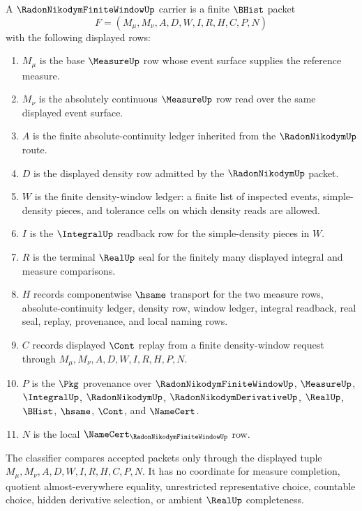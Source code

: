 \begin{definition}
\label{def:radon-nikodym-finite-window-carrier}
A $\RadonNikodymFiniteWindowUp$ carrier is a finite $\BHist$ packet
$$
F=(M_\mu,M_\nu,A,D,W,I,R,H,C,P,N)
$$
with the following displayed rows:
\begin{enumerate}
\item $M_\mu$ is the base $\MeasureUp$ row whose event surface supplies the reference measure.
\item $M_\nu$ is the absolutely continuous $\MeasureUp$ row read over the same displayed event surface.
\item $A$ is the finite absolute-continuity ledger inherited from the $\RadonNikodymUp$ route.
\item $D$ is the displayed density row admitted by the $\RadonNikodymUp$ packet.
\item $W$ is the finite density-window ledger: a finite list of inspected events, simple-density pieces, and tolerance cells on which density reads are allowed.
\item $I$ is the $\IntegralUp$ readback row for the simple-density pieces in $W$.
\item $R$ is the terminal $\RealUp$ seal for the finitely many displayed integral and measure comparisons.
\item $H$ records componentwise $\hsame$ transport for the two measure rows, absolute-continuity ledger, density row, window ledger, integral readback, real seal, replay, provenance, and local naming rows.
\item $C$ records displayed $\Cont$ replay from a finite density-window request through $M_\mu,M_\nu,A,D,W,I,R,H,P,N$.
\item $P$ is the $\Pkg$ provenance over $\RadonNikodymFiniteWindowUp$, $\MeasureUp$, $\IntegralUp$, $\RadonNikodymUp$, $\RadonNikodymDerivativeUp$, $\RealUp$, $\BHist$, $\hsame$, $\Cont$, and $\NameCert$.
\item $N$ is the local $\NameCert_{\RadonNikodymFiniteWindowUp}$ row.
\end{enumerate}
The classifier compares accepted packets only through the displayed tuple $M_\mu,M_\nu,A,D,W,I,R,H,C,P,N$. It has no coordinate for measure completion, quotient almost-everywhere equality, unrestricted representative choice, countable choice, hidden derivative selection, or ambient $\RealUp$ completeness.
\end{definition}

